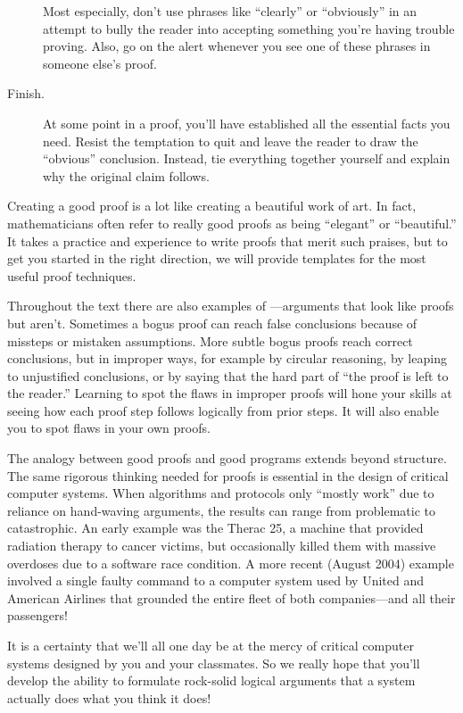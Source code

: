 \begin{description}
  Most especially, don't use phrases like ``clearly'' or ``obviously'' in
  an attempt to bully the reader into accepting something you're having
  trouble proving.  Also, go on the alert whenever you see one of these
  phrases in someone else's proof.

\item[Finish.]  At some point in a proof, you'll have established all the
essential facts you need.  Resist the temptation to quit and leave the
reader to draw the ``obvious'' conclusion.  Instead, tie everything
together yourself and explain why the original claim follows.

\end{description}

Creating a good proof is a lot like creating a beautiful work of art.  In
fact, mathematicians often refer to really good proofs as being
``elegant'' or ``beautiful.''  It takes a practice and experience to write
proofs that merit such praises,  but to get you started in
the right direction, we will provide templates for the most useful proof
techniques.

Throughout the text there are also examples of ---arguments that look like proofs but aren't.  Sometimes a bogus
proof can reach false conclusions because of missteps or mistaken
assumptions.  More subtle bogus proofs reach correct conclusions, but in
improper ways, for example by circular reasoning, by leaping to
unjustified conclusions, or by saying that the hard part of ``the proof is
left to the reader.''  Learning to spot the flaws in improper proofs will
hone your skills at seeing how each proof step follows logically from
prior steps.  It will also enable you to spot flaws in your own proofs.

The analogy between good proofs and good programs extends beyond
structure.  The same rigorous thinking needed for proofs is essential in
the design of critical computer systems.  When algorithms and protocols
only ``mostly work'' due to reliance on hand-waving arguments, the results
can range from problematic to catastrophic.  An early example was the
Therac 25, a machine that provided radiation therapy to cancer victims,
but occasionally killed them with massive overdoses due to a software race
condition.  A more recent (August 2004) example involved a single faulty
command to a computer system used by United and American Airlines that
grounded the entire fleet of both companies---and all their passengers!

It is a certainty that we'll all one day be at the mercy of critical
computer systems designed by you and your classmates.  So we really
hope that you'll develop the ability to formulate rock-solid logical
arguments that a system actually does what you think it does!


\endinput
